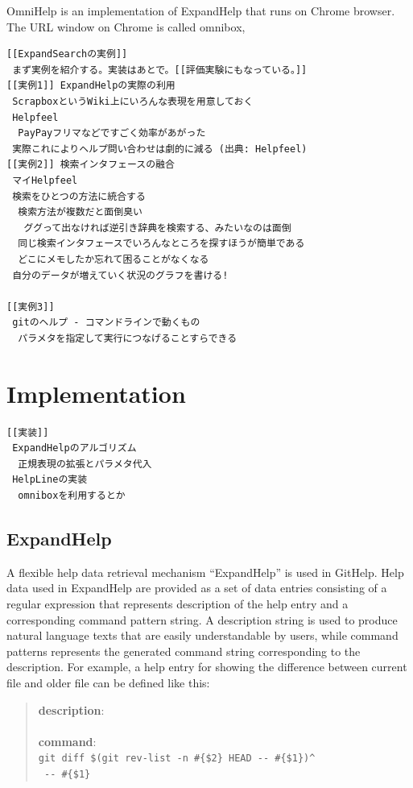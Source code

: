 \documentclass[manuscript,screen,review]{acmart}
\def\GH{\textsf{GitHelp}}
\def\EH{\textsf{ExpandHelp}}
\begin{document}
OmniHelp is an implementation of ExpandHelp that runs on Chrome browser.
The URL window on Chrome is called omnibox, 

\begin{verbatim}
[[ExpandSearchの実例]]
 まず実例を紹介する。実装はあとで。[[評価実験にもなっている。]]
[[実例1]] ExpandHelpの実際の利用
 ScrapboxというWiki上にいろんな表現を用意しておく
 Helpfeel
  PayPayフリマなどですごく効率があがった
 実際これによりヘルプ問い合わせは劇的に減る (出典: Helpfeel)
[[実例2]] 検索インタフェースの融合
 マイHelpfeel
 検索をひとつの方法に統合する
  検索方法が複数だと面倒臭い
   ググって出なければ逆引き辞典を検索する、みたいなのは面倒
  同じ検索インタフェースでいろんなところを探すほうが簡単である
  どこにメモしたか忘れて困ることがなくなる
 自分のデータが増えていく状況のグラフを書ける!

[[実例3]]
 gitのヘルプ - コマンドラインで動くもの
  パラメタを指定して実行につなげることすらできる
\end{verbatim}

\section{Implementation}

\begin{verbatim}
[[実装]]
 ExpandHelpのアルゴリズム
  正規表現の拡張とパラメタ代入
 HelpLineの実装
  omniboxを利用するとか
\end{verbatim}

\subsection{ExpandHelp}

A flexible help data retrieval mechanism ``{\EH}'' is used in {\GH}.
%
Help data used in {\EH} are provided as a set of data entries
consisting of a regular expression that represents description of the help entry
and a corresponding command pattern string.
A description string is used to produce natural language texts
that are easily understandable by users,
while command patterns represents the generated command string
corresponding to the description.
%
For example, a help entry for showing the difference between
current file and older file can be defined like this:

\begin{quote}
  \textbf{description}: \\
  \\
  \textbf{command}: \\
  {\smallfont\verb|git diff $(git rev-list -n #{$2} HEAD -- #{$1})^|} \\
  {\smallfont\verb| -- #{$1}|}
\end{quote}
\end{document}
